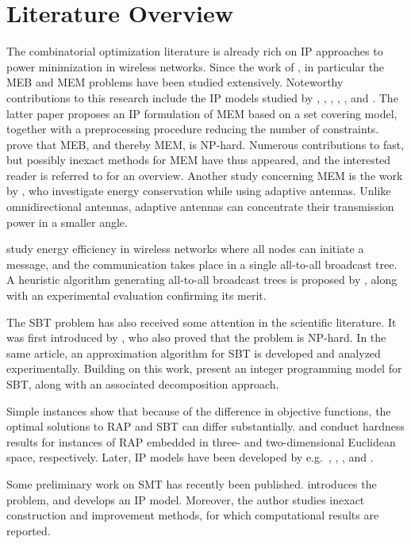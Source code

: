 \section{Literature Overview}
\label{sec:literature}

The combinatorial optimization literature is already rich on IP approaches to power minimization in wireless networks.
Since the work of \citet{Wieseltier00onthe}, in particular the MEB and MEM problems have been studied extensively.
Noteworthy contributions to this research include the IP models studied by \citet{das03},
\citet{altinkemer05}, \citet{yuan05}, \citet{yuan08}, \citet{bauer08}, \citet{montemanni11} and \citet{leggieri08}. 
The latter paper proposes an IP formulation of MEM based on a set covering model, together with a preprocessing procedure reducing the number of constraints.
\citet{cagalj02} prove that MEB, and thereby MEM, is NP-hard.
Numerous contributions to fast, but possibly inexact methods for MEM have thus appeared, and the interested reader is referred to \citep{hsiao13} for an overview. 
Another study concerning MEM is the work by \cite{guo}, who investigate energy conservation while using adaptive antennas. 
Unlike omnidirectional antennas, adaptive antennas can concentrate their transmission power in a smaller angle.

\citet{bein10} study energy efficiency in wireless networks where all nodes can initiate a message, and the communication takes place in a single all-to-all broadcast tree.
A heuristic algorithm generating all-to-all broadcast trees is proposed by \citet{bhukya14}, along with an experimental evaluation confirming its merit.

The SBT problem has also received some attention in the scientific literature.
It was first introduced by \citet{Papadimitriou06SBT}, who also proved that the problem is NP-hard.
In the same article, an approximation algorithm for SBT is developed and analyzed experimentally.
Building on this work, \citet{Haugland12Dual} present an integer programming model for SBT, along with an associated decomposition approach.

Simple instances \citep{Haugland12Dual} show that because of the difference in objective functions, the optimal solutions to RAP and SBT can differ substantially.
\citet{kirousis97} and \citet{clementi99} conduct
hardness results for instances of RAP embedded in three- and two-dimensional Euclidean space, respectively.
Later, IP models have been developed by e.g.\ \citet{althaus03}, \citet{montemanni04}, \citet{das05}, and \citet{Haugland11Compact}.

Some preliminary work on SMT has recently been published.
\citet{ivanova16isco} introduces the problem, and develops an IP model.
Moreover, the author studies inexact construction and improvement methods, for which computational results are reported.
